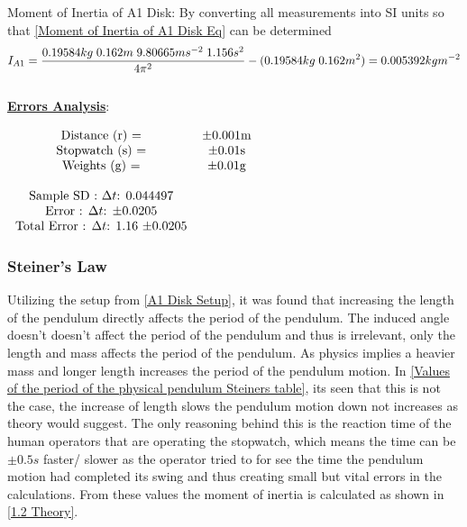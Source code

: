 \documentclass[12pt]{article}
\begin{document}
Moment of Inertia of A1 Disk:
By converting all measurements into SI units so that \cref{Moment of Inertia of A1 Disk Eq} can be determined
\begin{equation}
 \centering
 I_{A1} = \dfrac{0.19584kg\hspace{0.1cm} 0.162m\hspace{0.1cm} 9.80665ms^{-2}\hspace{0.1cm} 1.156s^2}{4{\pi}^2} - (0.19584kg\hspace{0.1cm} 0.162m^2) = 0.005392kgm^{-2}
 \label{Moment of Inertia of A1 Disk Eq Ans}
\end{equation} \\

\textbf{\underline{Errors Analysis}}: \\
\begin{table}[H]
\begin{center}
 \begin{math}
 \begin{tabular}{c c c}
 Distance (r)  = & $\pm$0.001m \\
 Stopwatch (s) = & $\pm$0.01s \\
 Weights (g) = & $\pm$0.01g \\ \\
 Sample SD : ${\Delta}t$: 0.044497 \\
 Error : ${\Delta}t$: ${\pm}$0.0205 \\
 Total Error : ${\Delta}t$: 1.16 ${\pm}$0.0205 \\
 \end{tabular}
 \end{math}
 
 \caption{Physical Pendulum Error Analysis.}
 \label{1.1 Error Analysis}
\end{center}
\end{table}

\subsubsection{Steiner's Law}
\label{Steiners Law Findings}

Utilizing the setup from \cref{A1 Disk Setup}, it was found that increasing the length of the pendulum directly affects the period of the pendulum. The induced angle doesn't doesn't affect the period of the pendulum and thus is irrelevant, only the length and mass affects the period of the pendulum. As physics implies a heavier mass and longer length increases the period of the pendulum motion. In \cref{Values of the period of the physical pendulum Steiners table}, its seen that this is not the case, the increase of length slows the pendulum motion  down not increases as theory would suggest. The only reasoning behind this is the reaction time of the human operators that are operating the stopwatch, which means the time can be $\pm0.5s$ faster/ slower as the operator tried to for see the time the pendulum motion had completed its swing and thus creating small but vital errors in the calculations. From these values the moment of inertia is calculated as shown in \cref{1.2 Theory}.   \\
\end{document}
